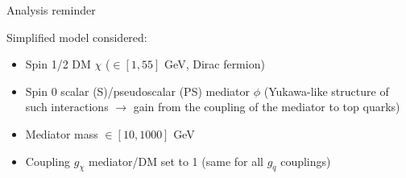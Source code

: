 \documentclass[8pt]{beamer}
\begin{document}
\begin{frame}{Analysis reminder}
\justifying

Simplified model considered:

\begin{itemize} 
	\justifying
	\item Spin 1/2 DM $\chi$ ($\in [1, 55]$ GeV, Dirac fermion) \\
	\item Spin 0 scalar (S)/pseudoscalar (PS) mediator $\phi$ (Yukawa-like structure of such interactions $\rightarrow$ gain from the coupling of the mediator to top quarks) \\
	\item Mediator mass $\in [10, 1000]$ GeV \\
	\item Coupling $g_{\chi}$ mediator/DM set to 1 (same for all $g_q$ couplings) \\
\end{itemize}\vfill


\end{frame}
\end{document}
